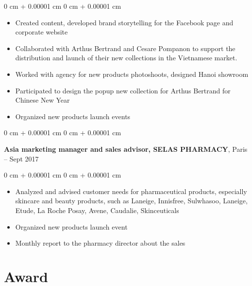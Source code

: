 \documentclass[10pt, letterpaper]{article}
\newenvironment{highlights}{
    \begin{itemize}[
        topsep=0.10 cm,
        parsep=0.10 cm,
        partopsep=0pt,
        itemsep=0pt,
        leftmargin=0 cm + 10pt
    ]
}{
    \end{itemize}
} %
\newenvironment{onecolentry}{
    \begin{adjustwidth}{
        0 cm + 0.00001 cm
    }{
        0 cm + 0.00001 cm
    }
}{
    \end{adjustwidth}
} %
\newenvironment{twocolentry}[2][]{
    \onecolentry
    \def\secondColumn{#2}
    \setcolumnwidth{\fill, 3.5 cm}
    \begin{paracol}{2}
}{
    \switchcolumn \raggedleft \secondColumn
    \end{paracol}
    \endonecolentry
} %
\begin{document}
        \vspace{0.10 cm}
        \begin{onecolentry}
            \begin{highlights}
\item Created content, developed brand storytelling for the Facebook page and corporate website
\item Collaborated with Arthus Bertrand and Cesare Pompanon to support the distribution and launch of their new collections in the Vietnamese market.
\item Worked with agency for new products photoshoots, designed Hanoi showroom
\item Participated to design the popup new collection for Arthus Bertrand for Chinese New Year
\item Organized new products launch events
      
            \end{highlights}
        \end{onecolentry}

        \vspace{0.2 cm}


        \begin{twocolentry}{
            2016 – Sept 2017
        }
            \textbf{Asia marketing manager and sales advisor, SELAS PHARMACY}, Paris\end{twocolentry}

        \vspace{0.10 cm}
        \begin{onecolentry}
            \begin{highlights}
\item Analyzed and advised customer needs for pharmaceutical products, especially skincare and beauty products, such as Laneige, Innisfree, Sulwhasoo, Laneige, Etude, La Roche Posay, Avene, Caudalie, Skinceuticals
\item Organized new products launch event
\item Monthly report to the pharmacy director about the sales
      
            \end{highlights}
        \end{onecolentry}



    \section{Award}
\end{document}
